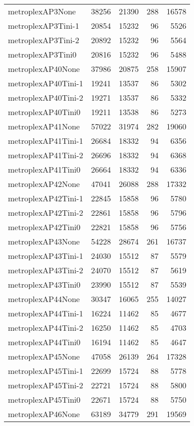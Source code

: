 \begin{longtable}{lrrrr}
metroplexAP3None & 38256 & 21390 & 288 & 16578 \\
metroplexAP3Tini-1 & 20854 & 15232 & 96 & 5526 \\
metroplexAP3Tini-2 & 20892 & 15232 & 96 & 5564 \\
metroplexAP3Tini0 & 20816 & 15232 & 96 & 5488 \\
metroplexAP40None & 37986 & 20875 & 258 & 15907 \\
metroplexAP40Tini-1 & 19241 & 13537 & 86 & 5302 \\
metroplexAP40Tini-2 & 19271 & 13537 & 86 & 5332 \\
metroplexAP40Tini0 & 19211 & 13538 & 86 & 5273 \\
metroplexAP41None & 57022 & 31974 & 282 & 19060 \\
metroplexAP41Tini-1 & 26684 & 18332 & 94 & 6356 \\
metroplexAP41Tini-2 & 26696 & 18332 & 94 & 6368 \\
metroplexAP41Tini0 & 26664 & 18332 & 94 & 6336 \\
metroplexAP42None & 47041 & 26088 & 288 & 17332 \\
metroplexAP42Tini-1 & 22845 & 15858 & 96 & 5780 \\
metroplexAP42Tini-2 & 22861 & 15858 & 96 & 5796 \\
metroplexAP42Tini0 & 22821 & 15858 & 96 & 5756 \\
metroplexAP43None & 54228 & 28674 & 261 & 16737 \\
metroplexAP43Tini-1 & 24030 & 15512 & 87 & 5579 \\
metroplexAP43Tini-2 & 24070 & 15512 & 87 & 5619 \\
metroplexAP43Tini0 & 23990 & 15512 & 87 & 5539 \\
metroplexAP44None & 30347 & 16065 & 255 & 14027 \\
metroplexAP44Tini-1 & 16224 & 11462 & 85 & 4677 \\
metroplexAP44Tini-2 & 16250 & 11462 & 85 & 4703 \\
metroplexAP44Tini0 & 16194 & 11462 & 85 & 4647 \\
metroplexAP45None & 47058 & 26139 & 264 & 17328 \\
metroplexAP45Tini-1 & 22699 & 15724 & 88 & 5778 \\
metroplexAP45Tini-2 & 22721 & 15724 & 88 & 5800 \\
metroplexAP45Tini0 & 22671 & 15724 & 88 & 5750 \\
metroplexAP46None & 63189 & 34779 & 291 & 19569 \\

\end{longtable}
